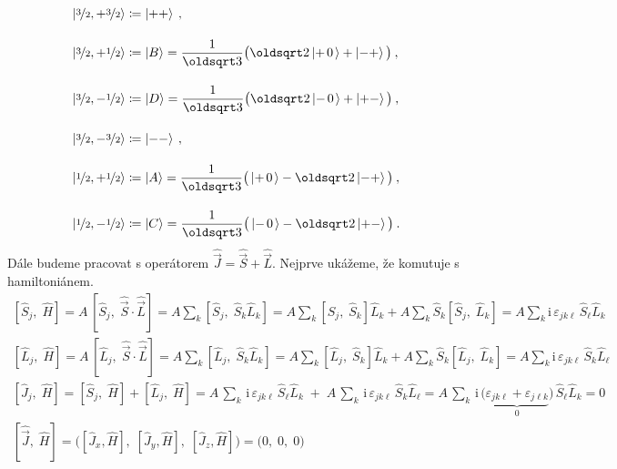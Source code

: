 \documentclass[10pt,a4paper]{article}
\newcommand*{\mask}[2]{%
    \mathord{\makebox[\widthof{\(#1\)}]{\(#2\)}}%
}
\newcommand{\comm}[2]{\left[ #1, #2 \right]}
\newcommand{\const}[1]{\text{#1}}
\newcommand{\ket}[1]{\left| #1 \right>}
\renewcommand{\i}{\const{i}}
\newcommand{\vechat}[1]{\hat{\vec{#1}}}
\def\0{\mask{+}{0}}
\begin{document}
\begin{align*}
    \ket{ \nicefrac{3}{2}, +\nicefrac{3}{2} }
    &\coloneqq \ket{++}
    \: , \\[10pt]
    \ket{ \nicefrac{3}{2}, +\nicefrac{1}{2} }
    &\coloneqq \ket{B}
    = \frac{1}{\oldsqrt 3} \big(
        \oldsqrt 2 \ket{+\0} + \ket{-+}
    \big)
    \: , \\[10pt]
    \ket{ \nicefrac{3}{2}, -\nicefrac{1}{2} }
    &\coloneqq \ket{D}
    = \frac{1}{\oldsqrt 3} \big(
        \oldsqrt 2 \ket{-\0} + \ket{+-}
    \big)
    \: , \\[10pt]
    \ket{ \nicefrac{3}{2}, -\nicefrac{3}{2} }
    &\coloneqq \ket{--}
    \: , \\[10pt]
    \ket{ \nicefrac{1}{2}, +\nicefrac{1}{2} }
    &\coloneqq \ket{A}
    = \frac{1}{\oldsqrt 3} \big(
        \ket{+\0} - \oldsqrt 2 \ket{-+}
    \big)
    \: , \\[10pt]
    \ket{ \nicefrac{1}{2}, -\nicefrac{1}{2} }
    &\coloneqq \ket{C}
    = \frac{1}{\oldsqrt 3} \big(
        \ket{-\0} - \oldsqrt 2 \ket{+-}
    \big)
    \: .
\end{align*}
Dále budeme pracovat s operátorem $\vechat J = \vechat S + \vechat L$. Nejprve ukážeme, že komutuje s hamiltoniánem.
\begin{gather*}
    \comm{\hat S_j}{\; \hat H}
    = A \, \comm{\hat S_j}{\; \vechat S \cdot \vechat L}
    = A \sum_k \comm{\hat S_j}{\; \hat S_k \hat L_k}
    = A \sum_k \comm{\hat S_j}{\; \hat S_k} \hat L_k
    + A \sum_k \hat S_k \comm{\hat S_j}{\; \hat L_k}
    = A \sum_k \i \, \varepsilon_{jk\ell} \, \hat S_\ell \hat L_k
    \\[10pt]
    \comm{\hat L_j}{\; \hat H}
    = A \, \comm{\hat L_j}{\; \vechat S \cdot \vechat L}
    = A \sum_k \comm{\hat L_j}{\; \hat S_k \hat L_k}
    = A \sum_k \comm{\hat L_j}{\; \hat S_k} \hat L_k
    + A \sum_k \hat S_k \comm{\hat L_j}{\; \hat L_k}
    = A \sum_k \i \, \varepsilon_{jk\ell} \, \hat S_k \hat L_\ell
    \\[10pt]
    \comm{\hat J_j}{\; \hat H}
    = \comm{\hat S_j}{\; \hat H}
    + \comm{\hat L_j}{\; \hat H}
    = A \, \sum_k \, \i \, \varepsilon_{jk\ell} \, \hat S_\ell \hat L_k
    \; + \;
    A \, \sum_k \, \i \, \varepsilon_{jk\ell} \, \hat S_k \hat L_\ell
    = A \, \sum_k \, \i \, \big(
        \underbrace{
            \varepsilon_{jk\ell} +
            \varepsilon_{j\ell k}
        }_0
    \big) \, \hat S_\ell \hat L_k
    = 0
    \\[10pt]
    \comm{\vechat J}{\; \hat H} = \big(
        \comm{\hat J_x}{\hat H}, \;
        \comm{\hat J_y}{\hat H}, \;
        \comm{\hat J_z}{\hat H}
    \big)
    = \big( 0 ,\; 0 ,\; 0\big)
\end{gather*}
\end{document}

